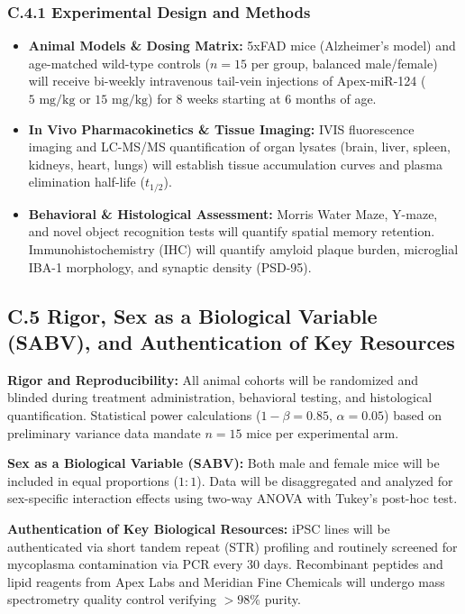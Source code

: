 \documentclass[11pt,letterpaper]{article}
\begin{document}
\subsubsection{C.4.1 Experimental Design and Methods}
\begin{itemize}
  \item \textbf{Animal Models \& Dosing Matrix:} 5xFAD mice (Alzheimer's model) and age-matched wild-type controls ($n = 15$ per group, balanced male/female) will receive bi-weekly intravenous tail-vein injections of Apex-miR-124 ($5\text{ mg/kg}$ or $15\text{ mg/kg}$) for 8 weeks starting at 6 months of age.
  \item \textbf{In Vivo Pharmacokinetics \& Tissue Imaging:} IVIS fluorescence imaging and LC-MS/MS quantification of organ lysates (brain, liver, spleen, kidneys, heart, lungs) will establish tissue accumulation curves and plasma elimination half-life ($t_{1/2}$).
  \item \textbf{Behavioral \& Histological Assessment:} Morris Water Maze, Y-maze, and novel object recognition tests will quantify spatial memory retention. Immunohistochemistry (IHC) will quantify amyloid plaque burden, microglial IBA-1 morphology, and synaptic density (PSD-95).
\end{itemize}

\subsection{C.5 Rigor, Sex as a Biological Variable (SABV), and Authentication of Key Resources}
\textbf{Rigor and Reproducibility:} All animal cohorts will be randomized and blinded during treatment administration, behavioral testing, and histological quantification. Statistical power calculations ($1 - \beta = 0.85$, $\alpha = 0.05$) based on preliminary variance data mandate $n = 15$ mice per experimental arm.

\textbf{Sex as a Biological Variable (SABV):} Both male and female mice will be included in equal proportions ($1:1$). Data will be disaggregated and analyzed for sex-specific interaction effects using two-way ANOVA with Tukey's post-hoc test.

\textbf{Authentication of Key Biological Resources:} iPSC lines will be authenticated via short tandem repeat (STR) profiling and routinely screened for mycoplasma contamination via PCR every 30 days. Recombinant peptides and lipid reagents from Apex Labs and Meridian Fine Chemicals will undergo mass spectrometry quality control verifying $>98\%$ purity.
\end{document}
